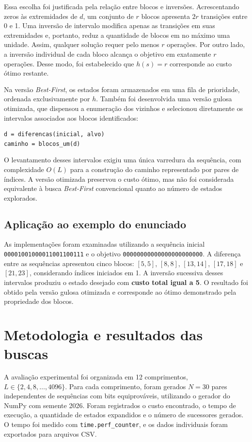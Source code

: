 \documentclass[10pt,a4paper,twocolumn]{article}
\begin{document}
Essa escolha foi justificada pela relação entre blocos e inversões. Acrescentando zeros às extremidades de $d$, um conjunto de $r$ blocos apresenta $2r$ transições entre 0 e 1. Uma inversão de intervalo modifica apenas as transições em suas extremidades e, portanto, reduz a quantidade de blocos em no máximo uma unidade. Assim, qualquer solução requer pelo menos $r$ operações. Por outro lado, a inversão individual de cada bloco alcança o objetivo em exatamente $r$ operações. Desse modo, foi estabelecido que $h(s)=r$ corresponde ao custo ótimo restante.

Na versão \textit{Best-First}, os estados foram armazenados em uma fila de prioridade, ordenada exclusivamente por $h$. Também foi desenvolvida uma versão gulosa otimizada, que dispensou a enumeração dos vizinhos e selecionou diretamente os intervalos associados aos blocos identificados:
\begin{lstlisting}
d = diferencas(inicial, alvo)
caminho = blocos_um(d)
\end{lstlisting}
O levantamento desses intervalos exigiu uma única varredura da sequência, com complexidade $O(L)$ para a construção do caminho representado por pares de índices. A versão otimizada preservou o custo ótimo, mas não foi considerada equivalente à busca \textit{Best-First} convencional quanto ao número de estados explorados.

\subsection{Aplicação ao exemplo do enunciado}
As implementações foram examinadas utilizando a sequência inicial \texttt{00001001000011001100111} e o objetivo \texttt{00000000000000000000000}. A diferença entre as sequências apresentou cinco blocos: $[5,5]$, $[8,8]$, $[13,14]$, $[17,18]$ e $[21,23]$, considerando índices iniciados em 1. A inversão sucessiva desses intervalos produziu o estado desejado com \textbf{custo total igual a 5}. O resultado foi obtido pela versão gulosa otimizada e corresponde ao ótimo demonstrado pela propriedade dos blocos.

\section{Metodologia e resultados das buscas}
A avaliação experimental foi organizada em 12 comprimentos, $L\in\{2,4,8,\ldots,4096\}$. Para cada comprimento, foram gerados $N=30$ pares independentes de sequências com bits equiprováveis, utilizando o gerador do NumPy com semente 2026. Foram registrados o custo encontrado, o tempo de execução, a quantidade de estados expandidos e o número de sucessores gerados. O tempo foi medido com \texttt{time.perf\_counter}, e os dados individuais foram exportados para arquivos CSV.
\end{document}
